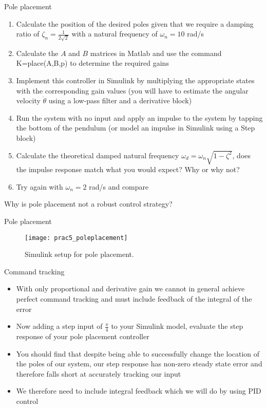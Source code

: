 \documentclass[9pt]{beamer-control}
\begin{document}
\begin{frame}{Pole placement}

\begin{enumerate}
	\item Calculate the position of the desired poles given that we require a damping ratio of $\zeta_n=\tfrac{1}{2\sqrt{2}}$ with a natural frequency of $\omega_n=10$ rad/s
	\item Calculate the $A$ and $B$ matrices in Matlab and use the command K=place(A,B,p) to determine the required gains 
	\item Implement this controller in Simulink by multiplying the appropriate states with the corresponding gain values (you will have to estimate the angular velocity $\dot{\theta}$ using a low-pass filter and a derivative block)
	\item Run the system with no input and apply an impulse to the system by tapping the bottom of the pendulum (or model an impulse in Simulink using a Step block)
	\item Calculate the theoretical damped natural frequency $\omega_d=\omega_n\sqrt{1-\zeta^2}$, does the impulse response match what you would expect? Why or why not?
	\item Try again with $\omega_n=2$ rad/s and compare
\end{enumerate}

Why is pole placement not a robust control strategy?

\end{frame}


\begin{frame}{Pole placement}

\begin{figure}
	\centering
	\texttt{[image: prac5\_poleplacement]}
	\caption{Simulink setup for pole placement.}
\end{figure}

\end{frame}


\begin{frame}{Command tracking}
\begin{itemize}
	\item With only proportional and derivative gain we cannot in general achieve perfect command tracking and must include feedback of the integral of the error
	\item Now adding a step input of $\tfrac{\pi}{4}$ to your Simulink model, evaluate the step response of your pole placement controller
	\item You should find that despite being able to successfully change the location of the poles of our system, our step response has non-zero steady state error and therefore falls short at accurately tracking our input
	\item We therefore need to include integral feedback which we will do by using PID control
\end{itemize}

\end{frame}
\end{document}
